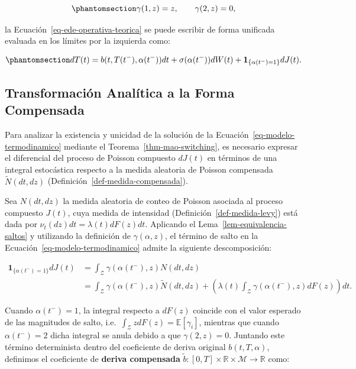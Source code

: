 \documentclass[
  spanish,
  letterpaper,
  DIV=11,
  numbers=noendperiod]{scrreprt}
\theoremstyle{plain}
\theoremstyle{plain}
\theoremstyle{plain}
\theoremstyle{definition}
\theoremstyle{remark}
\begin{document}
\begin{equation}\phantomsection\label{eq-funcion-salto}{
\gamma(1, z) = z, \qquad \gamma(2, z) = 0,
}\end{equation}

la Ecuación~\ref{eq-ede-operativa-teorica} se puede escribir de forma
unificada evaluada en los límites por la izquierda como:

\begin{equation}\phantomsection\label{eq-modelo-termodinamico}{
dT(t) = b(t, T(t^-), \alpha(t^-)) dt + \sigma(\alpha(t^-)) dW(t) + \mathbf{1}_{\{\alpha(t^-) = 1\}} dJ(t).
}\end{equation}

\subsection{Transformación Analítica a la Forma
Compensada}\label{transformaciuxf3n-analuxedtica-a-la-forma-compensada}

Para analizar la existencia y unicidad de la solución de la
Ecuación~\ref{eq-modelo-termodinamico} mediante el
Teorema~\ref{thm-mao-switching}, es necesario expresar el diferencial
del proceso de Poisson compuesto \(dJ(t)\) en términos de una integral
estocástica respecto a la medida aleatoria de Poisson compensada
\(\tilde{N}(dt, dz)\) (Definición~\ref{def-medida-compensada}).

Sea \(N(dt, dz)\) la medida aleatoria de conteo de Poisson asociada al
proceso compuesto \(J(t)\), cuya medida de intensidad
(Definición~\ref{def-medida-levy}) está dada por
\(\nu_t(dz)dt = \lambda(t)dF(z)dt\). Aplicando el
Lema~\ref{lem-equivalencia-saltos} y utilizando la definición de
\(\gamma(\alpha, z)\), el término de salto en la
Ecuación~\ref{eq-modelo-termodinamico} admite la siguiente
descomposición:

\[
\begin{aligned}
\mathbf{1}_{\{\alpha(t^-) = 1\}} dJ(t) &= \int_{\mathcal{Z}} \gamma(\alpha(t^-), z) N(dt, dz) \\
&= \int_{\mathcal{Z}} \gamma(\alpha(t^-), z) \tilde{N}(dt, dz) + \left( \lambda(t) \int_{\mathcal{Z}} \gamma(\alpha(t^-), z) dF(z) \right) dt.
\end{aligned}
\]

Cuando \(\alpha(t^-) = 1\), la integral respecto a \(dF(z)\) coincide
con el valor esperado de las magnitudes de salto,
i.e.~\(\displaystyle \int_{\mathcal{Z}} z dF(z) = \mathbb{E}[\gamma_i]\),
mientras que cuando \(\alpha(t^-) = 2\) dicha integral se anula debido a
que \(\gamma(2, z) = 0\). Juntando este término determinista dentro del
coeficiente de deriva original \(b(t, T, \alpha)\), definimos el
coeficiente de \textbf{deriva compensada}
\(\tilde{b}: [0, T] \times \mathbb{R} \times \mathcal{M} \to \mathbb{R}\)
como:
\end{document}
